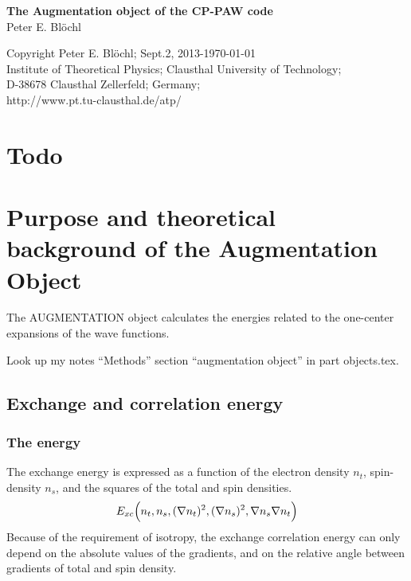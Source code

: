 \documentclass[11pt,a4paper]{report}
\begin{document}
\begin{titlepage}
\begin{center}
\vspace*{3.5cm}
{\huge \textbf{The Augmentation object of the CP-PAW code}}\\
\vspace{0.5cm}
{\large Peter E. Bl\"ochl}
\vspace{0.5cm} 
\end{center}

\vfill
\begin{center}
Copyright Peter E. Bl\"ochl; Sept.2, 2013-\today\\
{\small
Institute of Theoretical Physics;
Clausthal University of Technology;\\ 
D-38678 Clausthal Zellerfeld; Germany;\\
http://www.pt.tu-clausthal.de/atp/}
\end{center}
\end{titlepage}
\noindent            
\tableofcontents
\chapter{Todo}
\chapter{Purpose and theoretical background of the Augmentation Object}
The AUGMENTATION object calculates the energies related to the
one-center expansions of the wave functions.

Look up my notes ``Methods'' section ``augmentation object'' in part
objects.tex.

\section{Exchange and correlation energy}
\subsection{The energy}

The exchange energy is expressed as a function of the electron density
$n_t$, spin-density $n_s$, and the squares of the total and spin
densities.
\begin{equation}
E_{xc}\Bigl(n_t,n_s,(\nabla n_t)^2,(\nabla n_s)^2,\nabla n_s\nabla n_t\Bigr)
\end{equation}
Because of the requirement of isotropy, the exchange correlation
energy can only depend on the absolute values of the gradients, and on
the relative angle between gradients of total and spin density.  
\end{document}
